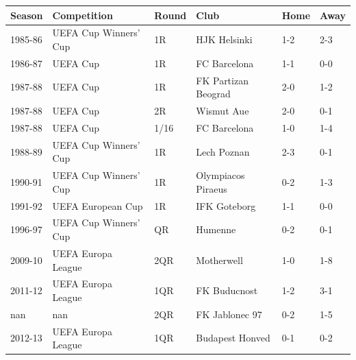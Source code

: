 \documentclass{article}
\begin{document}
\begin{tabular}{llllll}
\toprule
Season & Competition & Round & Club & Home & Away \\
\midrule
1985-86 & UEFA Cup Winners' Cup & 1R & HJK Helsinki & 1-2 & 2-3 \\
1986-87 & UEFA Cup & 1R & FC Barcelona & 1-1 & 0-0 \\
1987-88 & UEFA Cup & 1R & FK Partizan Beograd & 2-0 & 1-2 \\
1987-88 & UEFA Cup & 2R & Wismut Aue & 2-0 & 0-1 \\
1987-88 & UEFA Cup & 1/16 & FC Barcelona & 1-0 & 1-4 \\
1988-89 & UEFA Cup Winners' Cup & 1R & Lech Poznan & 2-3 & 0-1 \\
1990-91 & UEFA Cup Winners' Cup & 1R & Olympiacos Piraeus & 0-2 & 1-3 \\
1991-92 & UEFA European Cup & 1R & IFK Goteborg & 1-1 & 0-0 \\
1996-97 & UEFA Cup Winners' Cup & QR & Humenne & 0-2 & 0-1 \\
2009-10 & UEFA Europa League & 2QR & Motherwell & 1-0 & 1-8 \\
2011-12 & UEFA Europa League & 1QR & FK Buducnost & 1-2 & 3-1 \\
nan & nan & 2QR & FK Jablonec 97 & 0-2 & 1-5 \\
2012-13 & UEFA Europa League & 1QR & Budapest Honved & 0-1 & 0-2 \\
\bottomrule
\end{tabular}
\end{document}
